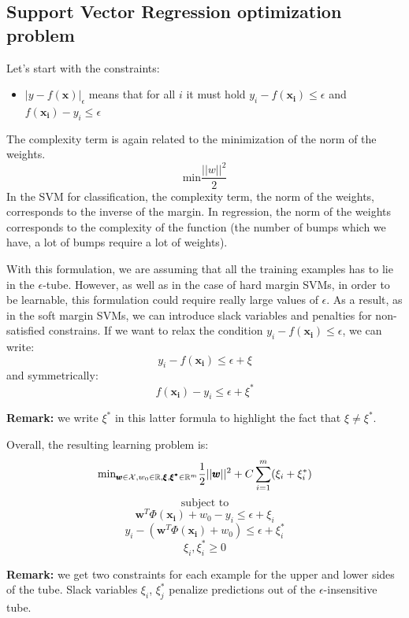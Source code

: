 \subsection{Support Vector Regression optimization problem}
Let's start with the constraints:
\begin{itemize}
    \item $|y-f(\pmb{x})|_\epsilon$ means that for all $i$ it must hold $y_i - f(\pmb{x_i}) \leq \epsilon$ and $f(\pmb{x_i}) - y_i \leq \epsilon$
\end{itemize}

The complexity term is again related to the minimization of the norm of the weights.
$$\text{min} \frac{||w||^2}{2}$$
In the SVM for classification, the complexity term, the norm of the weights, corresponds to the inverse of the margin. In regression, the norm of the weights corresponds to the complexity of the function (the number of bumps which we have, a lot of bumps require a lot of weights). \newline

With this formulation, we are assuming that all the training examples has to lie in the $\epsilon$-tube. However, as well as in the case of hard margin SVMs, in order to be learnable, this formulation could require really large values of $\epsilon$. As a result, as in the soft margin SVMs, we can introduce slack variables and penalties for non-satisfied constrains. If we want to relax the condition $y_i - f(\pmb{x_i}) \leq \epsilon$, we can write:
$$y_i - f(\pmb{x_i}) \leq \epsilon + \xi$$ and symmetrically: $$f(\pmb{x_i}) - y_i \leq \epsilon + \xi^*$$

\textbf{Remark:} we write $\xi^*$ in this latter formula to highlight the fact that $\xi \neq \xi^*$. \newline

Overall, the resulting learning problem is:
\begin{equation}
    \text{min}_{\pmb{w} \in \mathcal{X}, w_0 \in \mathbb{R}, \pmb{\xi}, \pmb{\xi^*} \in \mathbb{R}^m} \frac{1}{2} ||\pmb{w}||^2 + C \sum_{i=1}^m (\xi_i + \xi_i^*) \end{equation}
    $$\text{subject to}$$
    $$\pmb{w}^T \Phi(\pmb{x_i}) + w_0 - y_i \leq \epsilon + \xi_i$$
    $$y_i - (\pmb{w}^T \Phi(\pmb{x_i})+w_0) \leq \epsilon + \xi_i^*$$
    $$\xi_i , \xi_i^* \geq 0$$

\textbf{Remark:} we get two constraints for each example for the upper and lower sides of the tube. Slack variables $\xi_i$, $\xi_j^*$ penalize predictions out of the $\epsilon$-insensitive tube. \newline

